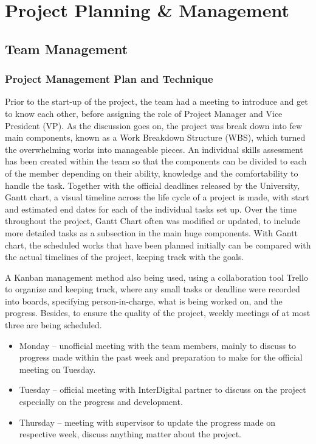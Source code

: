 \chapter{Project Planning \& Management} \label{Chapter:Project Planning & Management}


\section{Team Management}
\subsection{Project Management Plan and Technique}
Prior to the start-up of the project, the team had a meeting to introduce and get to know each other, before assigning the role of Project Manager and Vice President (VP). As the discussion goes on, the project was break down into few main components, known as a Work Breakdown Structure (WBS), which turned the overwhelming works into manageable pieces. An individual skills assessment has been created within the team so that the components can be divided to each of the member depending on their ability, knowledge and the comfortability to handle the task. Together with the official deadlines released by the University, Gantt chart, a visual timeline across the life cycle of a project is made, with start and estimated end dates for each of the individual tasks set up. Over the time throughout the project, Gantt Chart often was modified or updated, to include more detailed tasks as a subsection in the main huge components. With Gantt chart, the scheduled works that have been planned initially can be compared with the actual timelines of the project, keeping track with the goals.

A Kanban management method also being used, using a collaboration tool Trello to organize and keeping track, where any small tasks or deadline were recorded into boards, specifying person-in-charge, what is being worked on, and the progress. Besides, to ensure the quality of the project, weekly meetings of at most three are being scheduled. 
\begin{itemize}
    \item Monday – unofficial meeting with the team members, mainly to discuss to progress made within the past week and preparation to make for the official meeting on Tuesday.
    \item Tuesday – official meeting with InterDigital partner to discuss on the project especially on the progress and development.
    \item Thursday – meeting with supervisor to update the progress made on respective week, discuss anything matter about the project.
\end{itemize}

